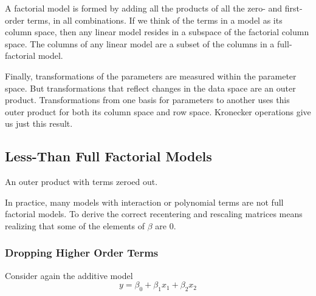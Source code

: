 \documentclass[]{article}
\begin{document}
A factorial model is formed by adding all the products of all the zero-
and first-order terms, in all combinations. If we think of the terms in
a model as its column space, then any linear model resides in a subspace
of the factorial column space. The columns of any linear model are a
subset of the columns in a full-factorial model.

Finally, transformations of the parameters are measured within the
parameter space. But transformations that reflect changes in the data
space are an outer product. Transformations from one basis for
parameters to another uses this outer product for both its column space
and row space. Kronecker operations give us just this result.

\hypertarget{less-than-full-factorial-models}{%
\subsection{Less-Than Full Factorial
Models}\label{less-than-full-factorial-models}}

An outer product with terms zeroed out.

In practice, many models with interaction or polynomial terms are not
full factorial models. To derive the correct recentering and rescaling
matrices means realizing that some of the elements of \(\beta\) are
\(0\).

\hypertarget{dropping-higher-order-terms}{%
\subsubsection{Dropping Higher Order
Terms}\label{dropping-higher-order-terms}}

Consider again the additive model
\[y = \beta_0 + \beta_1x_1 + \beta_2x_2\]
\end{document}
